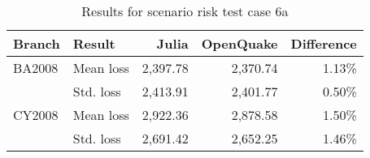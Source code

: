 \begin{table}[htbp]

\centering
\begin{tabular}{ l l r r r }

\hline
\rowcolor{anti-flashwhite}
\bf{Branch} & \bf{Result} & \bf{Julia} & \bf{OpenQuake} & \bf{Difference}\\
\hline
BA2008 & Mean loss & 2,397.78 & 2,370.74 & 1.13\% \\
       & Std. loss & 2,413.91 & 2,401.77 & 0.50\% \\
CY2008 & Mean loss & 2,922.36 & 2,878.58 & 1.50\% \\
       & Std. loss & 2,691.42 & 2,652.25 & 1.46\% \\
\hline
\end{tabular}

\caption{Results for scenario risk test case 6a}
\label{tab:result-sr-6a}
\end{table}